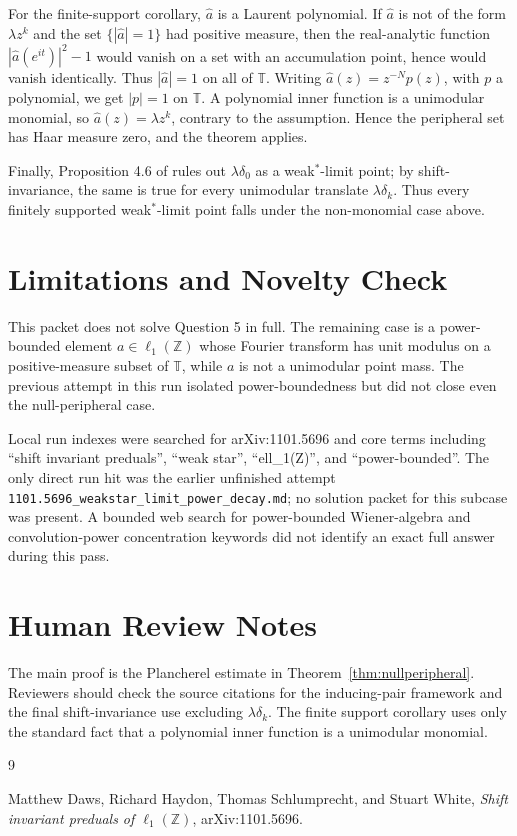 \documentclass[11pt]{article}
\newcommand{\Z}{\mathbb Z}
\newcommand{\T}{\mathbb T}
\begin{document}
For the finite-support corollary, \(\widehat a\) is a Laurent polynomial.  If
\(\widehat a\) is not of the form \(\lambda z^k\) and the set
\(\{|\widehat a|=1\}\) had positive measure, then the real-analytic function
\(|\widehat a(e^{it})|^2-1\) would vanish on a set with an accumulation point,
hence would vanish identically.  Thus \(|\widehat a|=1\) on all of \(\T\).
Writing \(\widehat a(z)=z^{-N}p(z)\), with \(p\) a polynomial, we get
\(|p|=1\) on \(\T\).  A polynomial inner function is a unimodular monomial, so
\(\widehat a(z)=\lambda z^k\), contrary to the assumption.  Hence the
peripheral set has Haar measure zero, and the theorem applies.

Finally, Proposition 4.6 of \cite{DHSW} rules out \(\lambda\delta_0\) as a
weak\(^*\)-limit point; by shift-invariance, the same is true for every
unimodular translate \(\lambda\delta_k\).  Thus every finitely supported
weak\(^*\)-limit point falls under the non-monomial case above.

\section*{Limitations and Novelty Check}

This packet does not solve Question 5 in full.  The remaining case is a
power-bounded element \(a\in\ell_1(\Z)\) whose Fourier transform has unit
modulus on a positive-measure subset of \(\T\), while \(a\) is not a
unimodular point mass.  The previous attempt in this run isolated
power-boundedness but did not close even the null-peripheral case.

Local run indexes were searched for arXiv:1101.5696 and core terms including
``shift invariant preduals'', ``weak star'', ``ell\_1(Z)'', and
``power-bounded''.  The only direct run hit was the earlier unfinished attempt
\texttt{1101.5696\_weakstar\_limit\_power\_decay.md}; no solution packet for this subcase
was present.  A bounded web search for power-bounded Wiener-algebra and
convolution-power concentration keywords did not identify an exact full answer
during this pass.

\section*{Human Review Notes}

The main proof is the Plancherel estimate in Theorem~\ref{thm:nullperipheral}.
Reviewers should check the source citations for the inducing-pair framework
and the final shift-invariance use excluding \(\lambda\delta_k\).  The finite
support corollary uses only the standard fact that a polynomial inner function
is a unimodular monomial.

\begin{thebibliography}{9}

Matthew Daws, Richard Haydon, Thomas Schlumprecht, and Stuart White,
\emph{Shift invariant preduals of \(\ell_1(\Z)\)}, arXiv:1101.5696.

\end{thebibliography}
\end{document}
